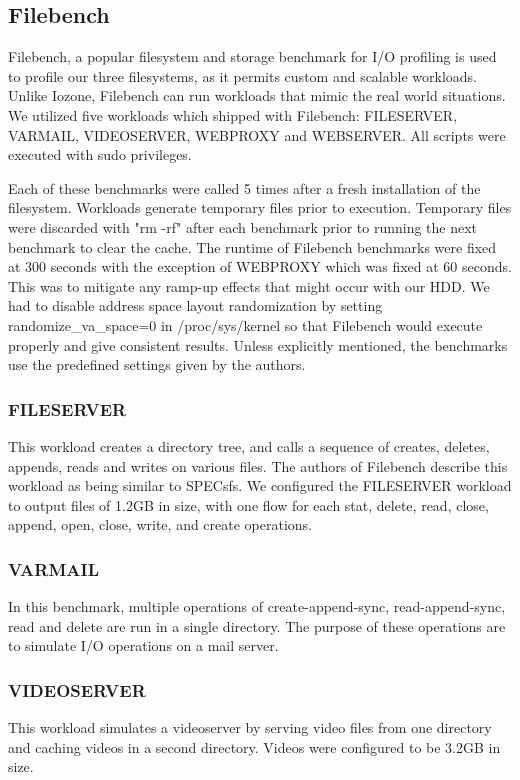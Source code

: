 \documentclass[letterpaper,twocolumn,10pt]{article}
\begin{document}
\subsection{Filebench}
Filebench, a popular filesystem and storage benchmark for I/O profiling is used to profile our three filesystems, as it permits custom and scalable workloads. Unlike Iozone, Filebench can run workloads that mimic the real world situations.  We utilized five workloads which shipped with Filebench: FILESERVER, VARMAIL, VIDEOSERVER, WEBPROXY and WEBSERVER. All scripts were executed with sudo privileges. 

Each of these benchmarks were called 5 times after a fresh installation of the filesystem. Workloads generate temporary files prior to execution. Temporary files were discarded with "rm -rf" after each benchmark prior to running the next benchmark to clear the cache. The runtime of Filebench benchmarks were fixed at 300 seconds with the exception of WEBPROXY which was fixed at 60 seconds. This was to mitigate any ramp-up effects that might occur with our HDD. We had to disable address space layout randomization by setting randomize\_va\_space=0 in /proc/sys/kernel so that Filebench would execute properly and give consistent results. Unless explicitly mentioned, the benchmarks use the predefined settings given by the authors.

\subsubsection{FILESERVER}
This workload creates a directory tree, and calls a sequence of creates, deletes, appends, reads and writes on various files. The authors of Filebench describe this workload as being similar to SPECsfs. We configured the FILESERVER workload to output files of 1.2GB in size, with one flow for each stat, delete, read, close, append, open, close, write, and create operations.

\subsubsection{VARMAIL}
In this benchmark, multiple operations of create-append-sync, read-append-sync, read and delete are run in a single directory. The purpose of these operations are to simulate I/O operations on a mail server. 

\subsubsection{VIDEOSERVER}
This workload simulates a videoserver by serving video files from one directory and caching videos in a second directory. Videos were configured to be 3.2GB in size.
\end{document}
